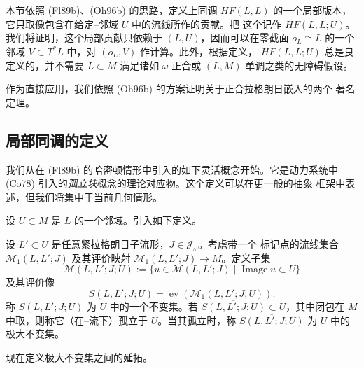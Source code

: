 \section{\termLocalFloerHomology{}}
\label{sec:local-floer-homology}

本节依照 (Fl89b)、(Oh96b) 的思路，定义\personFloer{}上同调 $HF(L,L)$ 的一个局部版本，
它只取像包含在给定\personDarboux{}--\personWeinstein{}邻域 $U$ 中的\personFloer{}流线所作的贡献。把
这个\termLocalFloerHomology{}记作 $HF(L,L;U)$。我们将证明，这个局部贡献只依赖于
$(L,U)$，因而可以在零截面 $o_L\cong L$ 的一个邻域
$V\subset T^*L$ 中，对 $(o_L,V)$ 作计算。此外，根据定义，
$HF(L,L;U)$ 总是良定义的，并不需要 $L\subset M$ 满足诸如 $\omega$ 正合或
$(L,M)$ 单调之类的无障碍假设。

作为直接应用，我们依照 (Oh96b) 的方案证明\personGromov{}关于正合拉格朗日嵌入的两个
著名定理。

\subsection{局部\personFloer{}同调的定义}
\label{subsec:definition-local-floer}

我们从\personFloer{}在 (Fl89b) 的哈密顿情形中引入的如下灵活概念开始。它是动力系统中
\personConley{} (Co78) 引入的\emph{孤立块}概念的\personFloer{}理论对应物。这个定义可以在更一般的抽象
框架中表述，但我们将集中于当前几何情形。

设 $U\subset M$ 是 $L$ 的一个\personDarboux{}邻域。引入如下定义。

\begin{definition}
\label{def:isolated-invariant-set}
设 $L'\subset U$ 是任意紧拉格朗日子流形，$J\in\mathcal J_\omega$。考虑带一个
标记点的\personFloer{}流线集合 $\mathcal M_1(L,L';J)$ 及其评价映射
$\mathcal M_1(L,L';J)\to M$。定义子集
\[
 \mathcal M(L,L';J;U):=\{u\in\mathcal M(L,L';J)\mid
 \operatorname{Image}u\subset U\}
\]
及其评价像
\[
 S(L,L';J;U)=\operatorname{ev}(\mathcal M_1(L,L';J;U)).
\]
称 $S(L,L';J;U)$ 为 $U$ 中的一个不变集。若
$\overline{S(L,L';J;U)}\subset U$，其中闭包在 $M$ 中取，则称它（在\personCauchy{}--\personRiemann{}流下）孤立于 $U$。当其孤立时，称
$\overline{S(L,L';J;U)}$ 为 $U$ 中的极大不变集。
\end{definition}

现在定义极大不变集之间的延拓。

